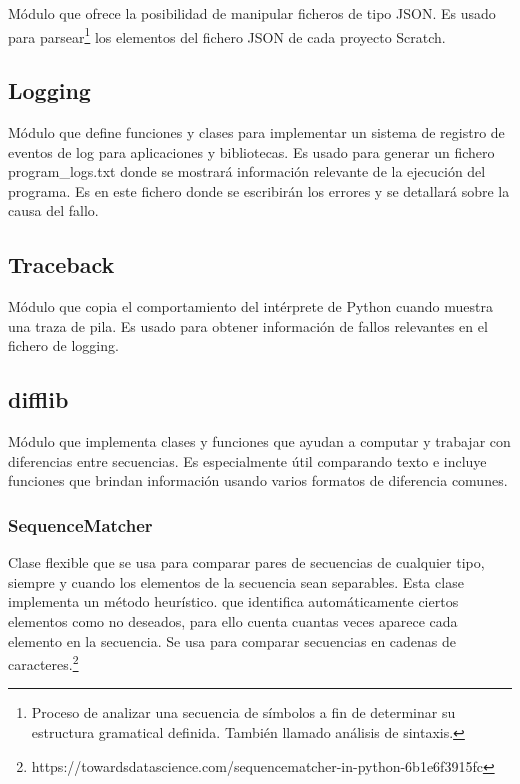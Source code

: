 \documentclass[a4paper, 12pt]{book}
\begin{document}
Módulo que ofrece la posibilidad de manipular ficheros de tipo JSON. Es usado para parsear\footnote{Proceso de analizar una secuencia de símbolos a fin de determinar su estructura gramatical definida. También llamado análisis de sintaxis.} los elementos del fichero JSON de cada proyecto Scratch.

\subsection{Logging}
\label{sec:logging}

Módulo que define funciones y clases para implementar un sistema de registro de eventos de log para aplicaciones y bibliotecas. Es usado para generar un fichero program\_logs.txt donde se mostrará información relevante de la ejecución del programa. Es en este fichero donde se escribirán los errores y se detallará sobre la causa del fallo.

\subsection{Traceback}
\label{sec:traceback}

Módulo que copia el comportamiento del intérprete de Python cuando muestra una traza de pila. Es usado para obtener información de fallos relevantes en el fichero de logging.

\subsection{difflib}
\label{sec:difflib}

Módulo que implementa clases y funciones que ayudan a computar y trabajar con diferencias entre secuencias. Es especialmente útil comparando texto e incluye funciones que brindan información usando varios formatos de diferencia comunes.

\subsubsection{SequenceMatcher}
\label{sec:difflib_SequenceMatcher} 

Clase flexible que se usa para comparar pares de secuencias de cualquier tipo, siempre y cuando los elementos de la secuencia sean separables. Esta clase implementa un método heurístico. que identifica automáticamente ciertos elementos como no deseados, para ello cuenta cuantas veces aparece cada elemento en la secuencia. Se usa para comparar secuencias en cadenas de caracteres.\footnote{https://towardsdatascience.com/sequencematcher-in-python-6b1e6f3915fc}
\end{document}
